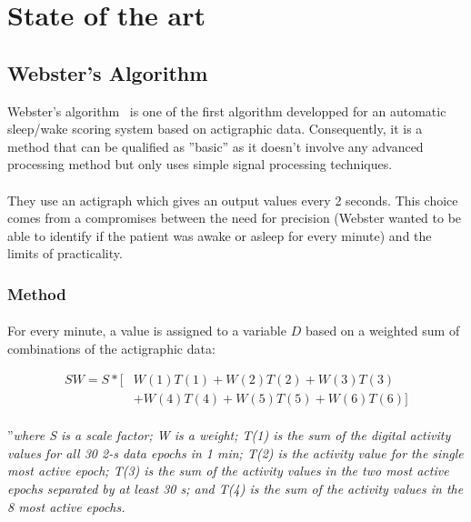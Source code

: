 \documentclass[a4paper,12pt]{article}
\begin{document}
\newpage

\section{State of the art}
\label{sec:stateOfTheArt}

\subsection{Webster's Algorithm}

Webster's algorithm~\cite{Webster1982} is one of the first algorithm developped for an automatic sleep/wake scoring system based on actigraphic data. Consequently, it is a method that can be qualified as ''basic'' as it doesn't involve any advanced processing method but only uses simple signal processing techniques.

\paragraph{}
They use an actigraph which gives an output values every 2 seconds. This choice comes from a compromises between the need for precision (Webster wanted to be able to identify if the patient was awake or asleep for every minute) and the limits of practicality.

\subsubsection{Method}

\paragraph{}
For every minute, a value is assigned to a variable $D$ based on a weighted sum of combinations of the actigraphic data:

\begin{equation}
\label{Webster_equationInit}
\begin{split}
SW = S * [&W(1)T(1) + W(2) T(2) + W(3) T(3) \\
         &+ W(4) T(4) + W(5) T(5) + W(6) T(6)]
\end{split}
\end{equation}

\paragraph{}
''\textit{where S is a scale factor; W is a weight; T(1) is the sum of the digital activity values for all 30 2-s data epochs in 1 min; T(2) is the activity value for the single most active epoch; T(3) is the sum of the activity values in the two most active epochs separated by at least 30 s; and T(4) is the sum of the activity values in the 8 most active epochs.}
\end{document}
